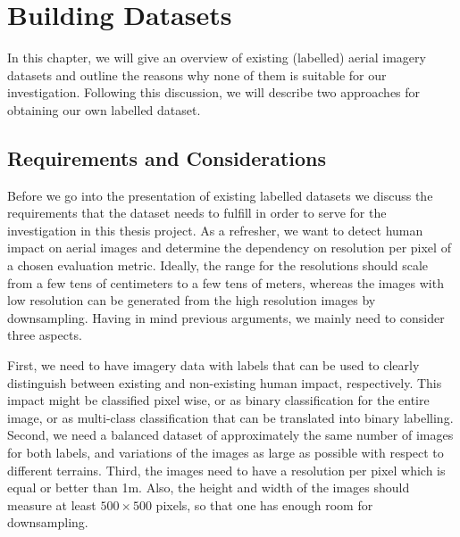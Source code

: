
\chapter{Building Datasets} %

\label{Chapter2} %


\newcommand{\keyword}[1]{\textbf{#1}}
\newcommand{\tabhead}[1]{\textbf{#1}}
\newcommand{\code}[1]{\texttt{#1}}
\newcommand{\file}[1]{\texttt{\bfseries#1}}
\newcommand{\option}[1]{\texttt{\itshape#1}}

In this chapter, we will give an overview of existing (labelled) aerial imagery datasets and outline the reasons why none of them is suitable for our investigation. Following this discussion, we will describe two approaches for obtaining our own labelled dataset.

\section{Requirements and Considerations}

Before we go into the presentation of existing labelled datasets we discuss the requirements that the dataset needs to fulfill in order to serve for the investigation in this thesis project. As a refresher, we want to detect human impact on aerial images and determine the dependency on resolution per pixel of a chosen evaluation metric. Ideally, the range for the resolutions should scale from a few tens of centimeters to a few tens of meters, whereas the images with low resolution can be generated from the high resolution images by downsampling. Having in mind previous arguments, we mainly need to consider three aspects. 

First, we need to have imagery data with labels that can be used to clearly distinguish between existing and non-existing human impact, respectively. This impact might be classified pixel wise, or as binary classification for the entire image, or as multi-class classification that can be translated into binary labelling. Second, 
we need a balanced dataset of approximately the same number of images for both labels, and variations of the images as large as possible with respect to different terrains. Third, the images need to have a resolution per pixel which is equal or better than 1m. Also, the height and width of the images should measure at least $500\times500$ pixels, so that one has enough room for downsampling. 

